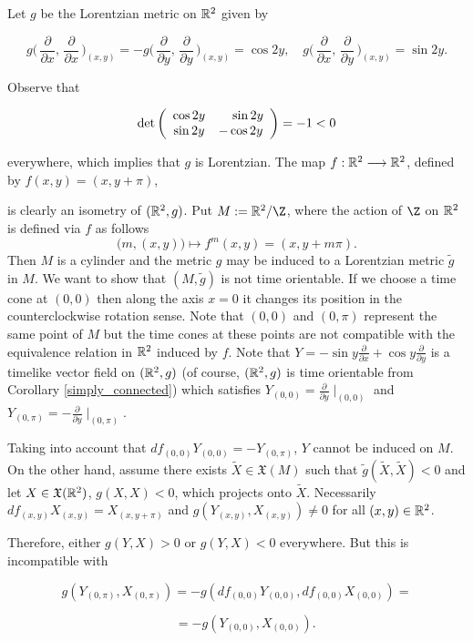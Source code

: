 \begin{exam} {\rm Let $g$ be the Lorentzian metric on $\mathbb{R}^2$ given by

\[

g\Big(\,\frac{\partial}{\partial x},\,\frac{\partial}{\partial x}\,\Big)_{(x,y)}=-g\Big(\,\frac{\partial}{\partial y},\,\frac{\partial}{\partial y}\,\Big)_{(x,y)} = \cos 2y, \quad g\Big(\,\frac{\partial}{\partial x},\,\frac{\partial}{\partial y}\,\Big)_{(x,y)}= \sin 2y.

\]

Observe that

\[

\mathrm{det}\left( \begin{array}{cc}

\cos 2y & \hspace*{4mm}\sin 2y  \\

\sin 2y & -\cos 2y

\end{array} \right)=-1<0

\]

everywhere, which implies that $g$ is Lorentzian. The map $f : \mathbb{R}^2 \longrightarrow \mathbb{R}^2$, defined by $f(x,y)=(x,y+\pi)$,

is clearly an isometry of $(\mathbb{R}^2,g)$. Put $M:=\R^2 / \Z$, where the action of $\Z$ on $\mathbb{R}^2$ is defined via $f$ as follows $$\big(m,(x,y)\big) \mapsto f^m(x,y)=(x,y+m\pi).$$ Then $M$ is a cylinder and the metric $g$ may be induced to a Lorentzian metric ${\tilde g}$ in $M$. We want to show that $(M,{\tilde g})$ is not time orientable. If we choose a time cone at $(0,0)$ then along the axis $x=0$ it changes its position in the counterclockwise rotation sense. Note that $(0,0)$ and $(0,\pi)$ represent the same point of $M$ but the time cones at these points are not compatible with the equivalence relation in $\mathbb{R}^2$ induced by $f$. Note that $Y=-\sin y \frac{\partial}{\partial x} + \cos y \frac{\partial}{\partial y}$ is a timelike vector field on $(\mathbb{R}^2,g)$ (of course, $(\mathbb{R}^2,g)$ is time orientable from Corollary \ref{simply_connected}) which satisfies $Y_{(0,0)}=\frac{\partial}{\partial y}\mid_{(0,0)}$ and $Y_{(0,\pi)}=-\frac{\partial}{\partial y}\mid_{(0,\pi)}$.

Taking into account that $df_{(0,0)}Y_{(0,0)}=-Y_{(0,\pi)}$, $Y$ cannot be induced on $M$. On the other hand, assume there exists ${\tilde X}\in \mathfrak{X}(M)$ such that ${\tilde g}({\tilde X},{\tilde X})<0$ and let $X\in \mathfrak{X}(\mathbb{R}^2)$, $g(X,X)<0$, which projects onto ${\tilde X}$. Necessarily $df_{(x,y)}X_{(x,y)}=X_{(x,y+\pi)}$ and $g(Y_{(x,y)},X_{(x,y)})\neq 0$ for all $(x,y)\in \mathbb{R}^2$.

Therefore, either $g(Y,X)>0$ or $g(Y,X)<0$ everywhere. But this is incompatible with

\[

g\left(Y_{(0,\pi)},X_{(0,\pi)}\right)=-g\left(df_{(0,0)}Y_{(0,0)},df_{(0,0)}X_{(0,0)}\right)=

\]

\[

\quad \, \, = -g\left(Y_{(0,0)},X_{(0,0)}\right).

\] }

\end{exam}


